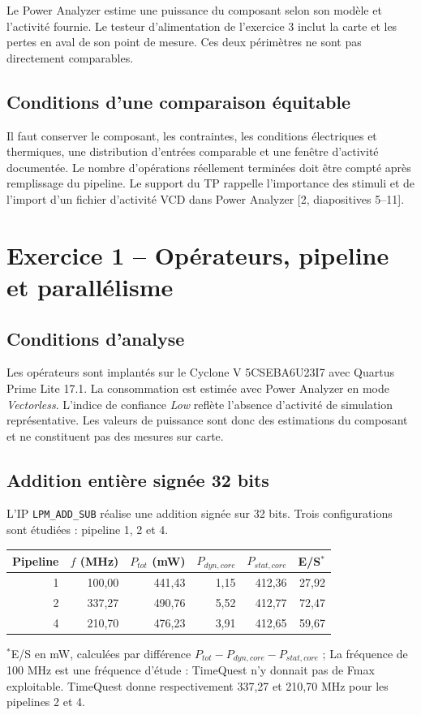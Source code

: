 \documentclass[11pt,a4paper]{article}
\begin{document}
Le Power Analyzer estime une puissance du composant selon son modèle et l'activité fournie. Le testeur d'alimentation de l'exercice 3 inclut la carte et les pertes en aval de son point de mesure. Ces deux périmètres ne sont pas directement comparables.

\subsection{Conditions d'une comparaison équitable}
Il faut conserver le composant, les contraintes, les conditions électriques et thermiques, une distribution d'entrées comparable et une fenêtre d'activité documentée. Le nombre d'opérations réellement terminées doit être compté après remplissage du pipeline. Le support du TP rappelle l'importance des stimuli et de l'import d'un fichier d'activité VCD dans Power Analyzer [2, diapositives 5--11].

\newpage
\begingroup\small\section{Exercice 1 -- Opérateurs, pipeline et parallélisme}
\subsection{Conditions d'analyse}
Les opérateurs sont implantés sur le Cyclone V 5CSEBA6U23I7 avec Quartus Prime Lite 17.1. La consommation est estimée avec Power Analyzer en mode \emph{Vectorless}. L'indice de confiance \emph{Low} reflète l'absence d'activité de simulation représentative. Les valeurs de puissance sont donc des estimations du composant et ne constituent pas des mesures sur carte.

\subsection{Addition entière signée 32 bits}
L'IP \texttt{LPM\_ADD\_SUB} réalise une addition signée sur 32 bits. Trois configurations sont étudiées : pipeline 1, 2 et 4.
\begin{center}
\begin{tabular}{@{}rrrrrr@{}}
\toprule
Pipeline & $f$ (MHz) & $P_{tot}$ (mW) & $P_{dyn,core}$ & $P_{stat,core}$ & E/S$^*$\\
\midrule
1 & 100,00 & 441,43 & 1,15 & 412,36 & 27,92\\
2 & 337,27 & 490,76 & 5,52 & 412,77 & 72,47\\
4 & 210,70 & 476,23 & 3,91 & 412,65 & 59,67\\
\bottomrule
\end{tabular}
\end{center}
$^*$E/S en mW, calculées par différence $P_{tot}-P_{dyn,core}-P_{stat,core}$ ;  La fréquence de 100 MHz est une fréquence d'étude : TimeQuest n'y donnait pas de Fmax exploitable. TimeQuest donne respectivement 337,27 et 210,70 MHz pour les pipelines 2 et 4.
\end{document}
